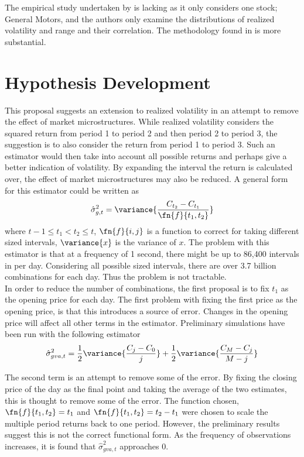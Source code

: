 \documentclass[12pt]{article}
\begin{document}
The empirical study undertaken by \citet{Christensen2007} is lacking as it only considers one stock; General
Motors, and the authors only examine the distributions of realized volatility and range and their
correlation. The methodology found in \citet{Martens2007} is more substantial.

\section{Hypothesis Development}

This proposal suggests an extension to realized volatility in an attempt to remove the effect of market
microstructures. While realized volatility considers the squared return from period 1 to period 2 and then
period 2 to period 3, the suggestion is to also consider the return from period 1 to period 3. Such an
estimator would then take into account all possible returns and perhaps give a better indication of
volatility. By expanding the interval the return is calculated over, the effect of market microstructures may
also be reduced. A general form for this estimator could be written as 
\begin{align*}
  \hat{\sigma}^2_{g,t} = \variance{ \frac{C_{t_2} - C_{t_1}}{\fn{f}{t_1,t_2}}}
\end{align*}
where $t - 1 \le t_1 < t_2 \le t$, $\fn{f}{i,j}$ is a function to correct for taking different sized intervals,
$\variance{x}$ is the variance of $x$. The problem with this estimator is that at a frequency of 1
second, there might be up to 86,400 intervals in per day. Considering all possible sized intervals, there are
over 3.7 billion combinations for each day. Thus the problem is not tractable. \\

In order to reduce the number of combinations, the first proposal is to fix $t_1$ as the opening price for
each day. The first problem with fixing the first price as the opening price, is that this introduces a source
of error. Changes in the opening price will affect all other terms in the estimator. Preliminary simulations
have been run with the following estimator
\begin{align}
  \hat{\sigma}^2_{gva,t} = \frac{1}{2} \variance{\frac{ C_j - C_0}{j}} +
  \frac{1}{2} \variance{\frac{ C_M - C_j}{M - j}} \label{eq:2}
\end{align}

The second term is an attempt to remove some of the error. By fixing the closing price of the day as the final
point and taking the average of the two estimates, this is thought to remove some of the error. The function
chosen, $\fn{f}{t_1,t_2} = t_1$ and $\fn{f}{t_1,t_2} = t_2 - t_1$ were chosen to scale the multiple period
returns back to one period. However, the preliminary results suggest this is not the correct functional
form. As the frequency of observations increases, it is found that $\hat{\sigma}^2_{gva,t}$ approaches 0. \\
\end{document}
